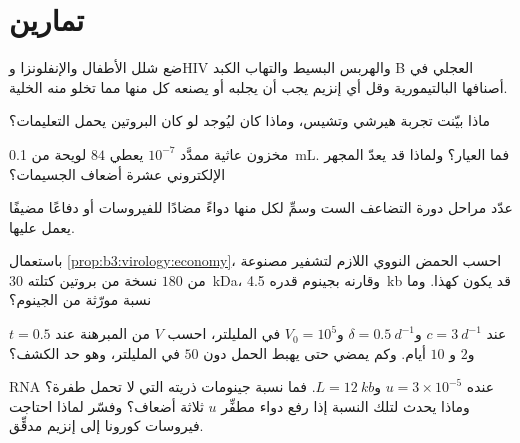 \section{تمارين}

\begin{exercise}[$\star$]\label{exo:b3:virology:1}
ضع شلل الأطفال والإنفلونزا وHIV والهربس البسيط والتهاب الكبد B  العجلي
في أصنافها البالتيمورية وقل أي إنزيم يجب أن يجلبه أو يصنعه كل منها
مما تخلو منه الخلية.
\end{exercise}

\begin{exercise}[$\star$]\label{exo:b3:virology:2}
ماذا بيّنت تجربة هيرشي وتشيس، وماذا كان ليُوجد
لو كان البروتين يحمل التعليمات؟
\end{exercise}

\begin{exercise}[$\star$]\label{exo:b3:virology:3}
مخزون عاثية ممدَّد $10^{-7}$ يعطي $84$ لويحة من \qty{0.1}{mL}.
فما العيار؟ ولماذا قد يعدّ المجهر الإلكتروني عشرة أضعاف
الجسيمات؟
\end{exercise}

\begin{exercise}[$\star$]\label{exo:b3:virology:4}
عدّد مراحل دورة التضاعف الست وسمِّ لكل منها دواءً
مضادًا للفيروسات أو دفاعًا مضيفًا يعمل عليها.
\end{exercise}

\begin{exercise}[$\star\star$]\label{exo:b3:virology:5}
باستعمال \cref{prop:b3:virology:economy}، احسب الحمض النووي اللازم
لتشفير   مصنوعة من $180$ نسخة من بروتين
كتلته \qty{30}{kDa}، وقارنه بجينوم قدره \qty{4.5}{kb} قد يكون 
كهذا. وما نسبة مورّثة  من الجينوم؟
\end{exercise}

\begin{exercise}[$\star\star$]\label{exo:b3:virology:6}
عند $c = \qty{3}{d^{-1}}$ و$\delta = \qty{0.5}{d^{-1}}$ و$V_{0} =
10^{5}$ في المليلتر، احسب $V$ من المبرهنة عند $t = 0.5$ و$2$ و
$10$ أيام. وكم يمضي حتى يهبط الحمل دون $50$ في المليلتر، وهو حد
الكشف؟
\end{exercise}

\begin{exercise}[$\star\star$]\label{exo:b3:virology:7}
 RNA عنده $u = 3\times 10^{-5}$ و$L = \qty{12}{kb}$. فما
نسبة جينومات ذريته التي لا تحمل طفرة؟ وماذا يحدث لتلك
النسبة إذا رفع دواء مطفِّر $u$ ثلاثة أضعاف؟ وفسّر لماذا احتاجت
فيروسات كورونا إلى إنزيم مدقِّق.
\end{exercise}

